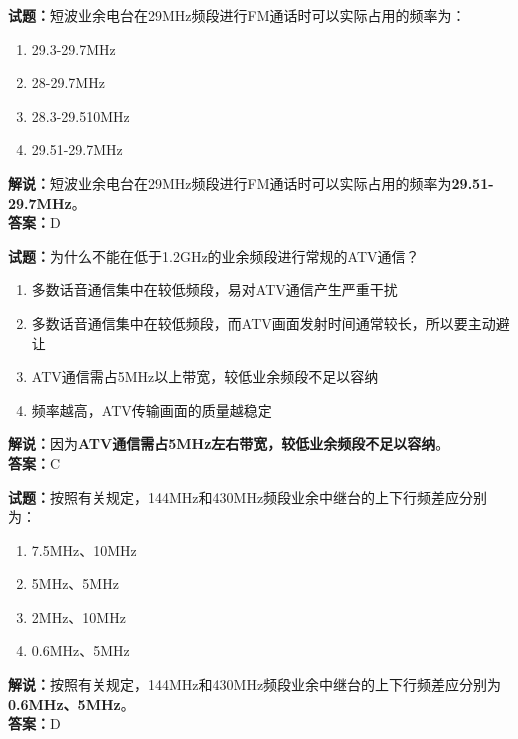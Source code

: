 \documentclass{ctexbook}
\begin{document}
\noindent\textbf{试题：}短波业余电台在29\unit{\MHz}频段进行FM通话时可以实际占用的频率为：
\begin{enumerate}[leftmargin=3em]
  \item 29.3-29.7\unit{\MHz}
  \item 28-29.7\unit{\MHz}
  \item 28.3-29.510\unit{\MHz}%
  \item 29.51-29.7\unit{\MHz}
\end{enumerate}
\noindent\textbf{解说：}短波业余电台在29\unit{\MHz}频段进行FM通话时可以实际占用的频率为\textbf{29.51-29.7\unit{\MHz}}。\\\noindent\textbf{答案：}D

\vspace{\baselineskip}

\noindent\textbf{试题：}为什么不能在低于1.2\unit{\GHz}的业余频段进行常规的ATV通信？
\begin{enumerate}[leftmargin=3em]
  \item 多数话音通信集中在较低频段，易对ATV通信产生严重干扰
  \item 多数话音通信集中在较低频段，而ATV画面发射时间通常较长，所以要主动避让
  \item ATV通信需占5\unit{\MHz}以上带宽，较低业余频段不足以容纳
  \item 频率越高，ATV传输画面的质量越稳定
\end{enumerate}
\noindent\textbf{解说：}因为\textbf{ATV通信需占5\unit{\MHz}左右带宽，较低业余频段不足以容纳}。\\\noindent\textbf{答案：}C

\vspace{\baselineskip}

\noindent\textbf{试题：}按照有关规定，144\unit{\MHz}和430\unit{\MHz}频段业余中继台的上下行频差应分别为：
\begin{enumerate}[leftmargin=3em]
  \item 7.5\unit{\MHz}、10\unit{\MHz}
  \item 5\unit{\MHz}、5\unit{\MHz}
  \item 2\unit{\MHz}、10\unit{\MHz}
  \item 0.6\unit{\MHz}、5\unit{\MHz}%
\end{enumerate}
\noindent\textbf{解说：}按照有关规定，144\unit{\MHz}和430\unit{\MHz}频段业余中继台的上下行频差应分别为\textbf{0.6\unit{\MHz}、5\unit{\MHz}}。\\\noindent\textbf{答案：}D
\end{document}
